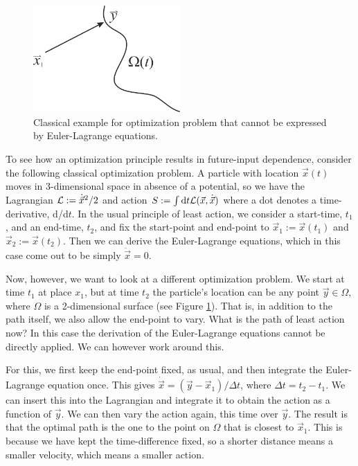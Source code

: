 \documentclass[12pt]{article}
\begin{document}
\begin{figure}[h]
\centering
\includegraphics[width=0.5\textwidth]{toy02.png}
\caption{Classical example for optimization problem that cannot be expressed by Euler-Lagrange equations.}
\label{toy02}
\end{figure}

To see how an optimization principle results in future-input dependence, consider the following classical optimization problem. A particle with location $\vec{x}(t)$ moves in 3-dimensional space in absence of a potential, so we have the Lagrangian ${\cal L} := \dot{\vec{x}}^2/2$ and action $S:= \int {\rm d}t {\cal{L}}(\vec{x},\dot{\vec x})$ where a dot denotes a time-derivative, d/d$t$. In the usual principle of least action, we consider a start-time, $t_1$, and an end-time, $t_2$, and fix the start-point and end-point to $\vec{x}_1:=\vec{x}(t_1)$ and $\vec{x}_2:=\vec{x}(t_2)$. Then we can derive the Euler-Lagrange equations, which in this case come out to be simply $\ddot{\vec{x}}=0$.

Now, however, we want to look at a different optimization problem. We start at time $t_1$ at place $x_1$, but at time $t_2$ the particle's location can be any point $\vec{y} \in \Omega$, where $\Omega$ is a 2-dimensional surface (see Figure \ref{toy02}). That is, in addition to the path itself, we also allow the end-point to vary. What is the path of least action now?  In this case the derivation of the Euler-Lagrange equations cannot be {directly} applied. We can however work around this. 

For this, we first keep the end-point fixed, as usual, and then integrate the Euler-Lagrange equation once. This gives $\dot{\vec{x}} = (\vec{y}-\vec{x}_1 )/\Delta t$, where $\Delta t = t_2 - t_1$. We can insert this into the Lagrangian and integrate it to obtain the action as a function of $\vec{y}$. We can then vary the action again, this time over $\vec{y}$. The result is that the optimal path is the one to the point on $\Omega$ that is closest to $\vec{x}_1$. This is because we have kept the time-difference fixed, so a shorter distance means a smaller velocity, which means a smaller action. 
\end{document}
